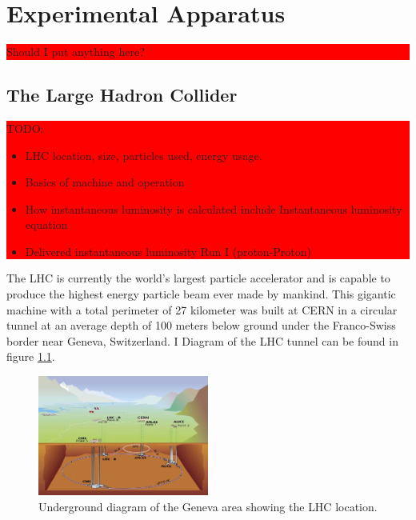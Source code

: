 \chapter{Experimental Apparatus}
\label{CHAPTER:ExperimentalApparatus}

\colorbox{red}{
\begin{minipage}{0.95\linewidth}
Should I put anything here?
\end{minipage}
}


\section{The Large Hadron Collider}
\label{SECTION:ExperimentalApparatus_LHC}

\colorbox{red}{
\begin{minipage}{0.95\linewidth}
TODO: 

\begin{itemize}
  \item LHC location, size, particles used, energy usage.
  \item Basics of machine and operation
  \item How instantaneous luminosity is calculated include Instantaneous luminosity equation
  \item Delivered instantaneous luminosity Run I (proton-Proton)
\end{itemize}

\end{minipage}
}

The \gls{LHC} \cite{ARTICLE:LHC Machine} is currently the world's largest particle accelerator and is capable to produce the highest energy particle beam ever made by mankind. This gigantic machine with a total perimeter of 27 kilometer was built at \gls{CERN} in a circular tunnel at an average depth of 100 meters below ground under the Franco-Swiss border near Geneva, Switzerland. I Diagram of the LHC tunnel can be found in figure \ref{FIGURE:ExperimentalApparatus_LHCLayoutUnderground}.

\begin{figure}[!htb]
  \centering
  \includegraphics[width=0.50\textwidth]{Chapter02_ExperimentalApparatus/Images/LHC_layout_underground.jpg}
  \caption{Underground diagram of the Geneva area showing the \gls{LHC} location.}
  \label{FIGURE:ExperimentalApparatus_LHCLayoutUnderground}
\end{figure}

